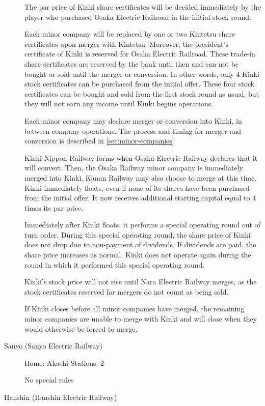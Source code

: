 \documentclass{article}
\begin{document}
\begin{CJK}{UTF8}{min}
\begin{multicols}{2}
\begin{description}
The par price of Kinki share certificates will be decided immediately
by the player who purchased Osaka Electric Railroad in the initial
stock round.

Each minor company will be replaced by one or two Kintetsu share
certificates upon merger with Kintetsu. Moreover, the president's
certificate of Kinki is reserved for Osaka Electric Railroad. These
trade-in share certificates are reserved by the bank until then and can not
be bought or sold until the merger or conversion. In other words, only
4 Kinki stock certificates can be purchased from the initial
offer. These four stock certificates can be bought and sold from the
first stock round as usual, but they will not earn any income until
Kinki begins operations.

Each minor company may declare merger or conversion into Kinki, in
between company operations. The process and timing for merger and
conversion is described in \autoref{sec:minor-companies}

Kinki Nippon Railway forms when Osaka Electric Railway declares that
it will convert. Then, the Osaka Railway minor company is immediately
merged into Kinki. Kanan Railway may also choose to merge at this
time. Kinki immediately floats, even if none of its shares have been
purchased from the initial offer. It now receives additional starting
capital equal to 4 times its par price.

Immediately after Kinki floats, it performs a special operating round
out of turn order. During this special operating round, the share
price of Kinki does not drop due to non-payment of dividends. If
dividends are paid, the share price increases as normal. Kinki does
not operate again during the round in which it performed this special
operating round.

Kinki's stock price will not rise until Nara Electric Railway merges,
as the stock certificates reserved for mergers do not count as being
sold.

If Kinki closes before all minor companies have merged, the remaining
minor companies are unable to merge with Kinki and will close when they would
otherwise be forced to merge.

\item[Sanyo (Sanyo Electric Railway)] \hfill

Home: Akashi \hfill Stations: 2

No special rules

\item[Hanshin (Hanshin Electric Railway)] \hfill


\end{description}
\end{multicols}
\end{CJK}
\end{document}
